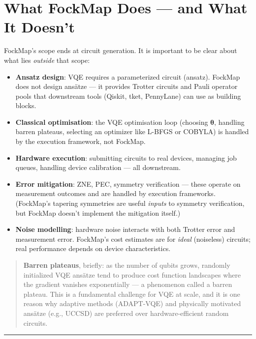 \documentclass[
  11pt,
  oneside]{book}
\providecommand{\tightlist}{%
  \setlength{\itemsep}{0pt}\setlength{\parskip}{0pt}}
\begin{document}
\section{What FockMap Does --- and What It
Doesn't}\label{what-fockmap-does-and-what-it-doesnt}

FockMap's scope ends at circuit generation. It is important to be clear
about what lies \emph{outside} that scope:

\begin{itemize}
\tightlist
\item
  \textbf{Ansatz design}: VQE requires a parameterized circuit (ansatz).
  FockMap does not design ansätze --- it provides Trotter circuits and
  Pauli operator pools that downstream tools (Qiskit, tket, PennyLane)
  can use as building blocks.
\item
  \textbf{Classical optimisation}: the VQE optimisation loop (choosing
  \(\boldsymbol{\theta}\), handling barren plateaus, selecting an
  optimizer like L-BFGS or COBYLA) is handled by the execution
  framework, not FockMap.
\item
  \textbf{Hardware execution}: submitting circuits to real devices,
  managing job queues, handling device calibration --- all downstream.
\item
  \textbf{Error mitigation}: ZNE, PEC, symmetry verification --- these
  operate on measurement outcomes and are handled by execution
  frameworks. (FockMap's tapering symmetries are useful \emph{inputs} to
  symmetry verification, but FockMap doesn't implement the mitigation
  itself.)
\item
  \textbf{Noise modelling}: hardware noise interacts with both Trotter
  error and measurement error. FockMap's cost estimates are for
  \emph{ideal} (noiseless) circuits; real performance depends on device
  characteristics.
\end{itemize}

\begin{quote}
\textbf{Barren plateaus}, briefly: as the number of qubits grows,
randomly initialized VQE ansätze tend to produce cost function
landscapes where the gradient vanishes exponentially --- a phenomenon
called a barren plateau. This is a fundamental challenge for VQE at
scale, and it is one reason why adaptive methods (ADAPT-VQE) and
physically motivated ansätze (e.g., UCCSD) are preferred over
hardware-efficient random circuits.
\end{quote}

\begin{center}\rule{0.5\linewidth}{0.5pt}\end{center}
\end{document}
